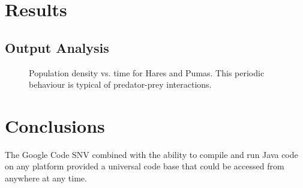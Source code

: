 \documentclass[11pt]{report}
\begin{document}
\chapter{Results}

	\section{Output Analysis}
	\begin{figure}[h]
   
   
   \caption{Population density vs. time for Hares and Pumas. This periodic behaviour is typical of predator-prey interactions.}
   \end{figure}

   

\chapter{Conclusions} %

	The Google Code SNV combined with the ability to compile and run Java code on any platform provided a universal code base that could be accessed from anywhere at any time.    
\end{document}
